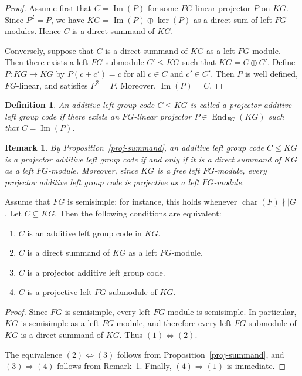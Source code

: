 \documentclass[11pt]{article}
\newtheorem{remark}[theorem]{Remark}
\newtheorem{definition}[theorem]{Definition}
\begin{document}
\begin{proof}
Assume first that $C=\operatorname{Im}(P)$ for some $FG$-linear projector $P$ on $KG$. Since $P^2=P$, we have $KG=\operatorname{Im}(P)\oplus\ker(P)$ as a direct sum of left $FG$-modules. Hence $C$ is a direct summand of $KG$.

Conversely, suppose that $C$ is a direct summand of $KG$ as a left $FG$-module. Then there exists a left $FG$-submodule $C'\le KG$ such that $KG=C\oplus C'$. Define $P:KG\to KG$ by $P(c+c')=c$ for all $c\in C$ and $c'\in C'$. Then $P$ is well defined, $FG$-linear, and satisfies $P^2=P$. Moreover, $\operatorname{Im}(P)=C$.
\end{proof}

\begin{definition}\label{def:projector-additive-code}
An additive left group code $C\le KG$ is called a \textit{projector additive left group code} if there exists an $FG$-linear projector $P\in\operatorname{End}_{FG}(KG)$ such that
$
C=\operatorname{Im}(P).
$


\end{definition}

\begin{remark}\label{projective}
By Proposition~\ref{proj-summand}, an additive left group code $C \leq KG$ is a projector additive left group code if and only if it is a direct summand of $KG$ as a left $FG$-module.
Moreover, since $KG$ is a free left $FG$-module, every projector additive left group code is projective as a left $FG$-module.
\end{remark}
\begin{corollary}\label{cor:semisimple-projector}
Assume that $FG$ is semisimple; for instance, this holds whenever $\operatorname{char}(F)\nmid |G|$. Let $C\subseteq KG$. Then the following conditions are equivalent:
\begin{enumerate}
    \item $C$ is an additive left group code in $KG$.
    \item $C$ is a direct summand of $KG$ as a left $FG$-module.
    \item $C$ is a projector additive left group code.
    \item $C$ is a projective left $FG$-submodule of $KG$.
\end{enumerate}
\end{corollary}

\begin{proof}
Since $FG$ is semisimple, every left $FG$-module is semisimple. In particular, $KG$ is semisimple as a left $FG$-module, and therefore every left $FG$-submodule of $KG$ is a direct summand of $KG$. Thus $(1)\Leftrightarrow(2)$.

The equivalence $(2)\Leftrightarrow(3)$ follows from Proposition~\ref{proj-summand}, and $(3)\Rightarrow(4)$ follows from Remark~\ref{projective}. Finally, $(4)\Rightarrow(1)$ is immediate.
\end{proof}
\end{document}
